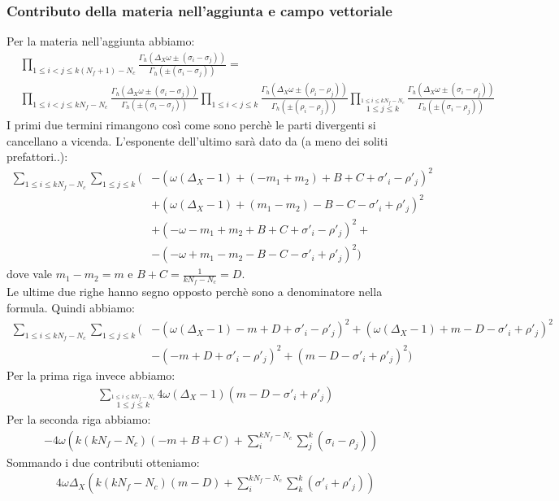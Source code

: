 \documentclass[a4paper,12pt]{article}
\begin{document}
\subsubsection{Contributo della materia nell'aggiunta e campo vettoriale }
Per la materia nell'aggiunta abbiamo:
\begin{align*}
& \prod_{ 1 \leq i<j \leq k(N_f+1)- N_c } \frac{ \Gamma_h( \Delta_X \omega \pm (\sigma_i - \sigma_j)) }{ \Gamma_h ( \pm (\sigma_i - \sigma_j) )} = \\
& \prod_{ 1 \leq i<j \leq kN_f- N_c } \frac{ \Gamma_h( \Delta_X \omega \pm (\sigma_i - \sigma_j)) }{ \Gamma_h ( \pm (\sigma_i - \sigma_j) )} 
 \prod_{ 1 \leq i<j \leq k } \frac{ \Gamma_h( \Delta_X \omega \pm (\rho_i - \rho_j)) }{ \Gamma_h ( \pm (\rho_i - \rho_j) )} 
 \prod_{ \overset{1 \leq i \leq kN_f- N_c }{ 1 \leq j \leq k }} \frac{ \Gamma_h( \Delta_X \omega \pm (\sigma_i - \rho_j)) }{ \Gamma_h ( \pm (\sigma_i - \rho_j) )} 
\end{align*}
I primi due termini rimangono così come sono perchè le parti divergenti si cancellano a vicenda.
L'esponente dell'ultimo sarà dato da (a meno dei soliti prefattori..):
\begin{align*}
\sum_{1 \leq i \leq kN_f- N_c } \sum_{ 1 \leq j \leq k }  \bigg( &  - \left( \omega( \Delta_X -1) + ( -m_1 + m_2) + B + C + \sigma'_i - \rho'_j \right)^2 \\
& + \left(  \omega( \Delta_X -1) + ( m_1 - m_2) - B - C - \sigma'_i + \rho'_j\right)^2 \\
& + \left( -\omega  - m_1 + m_2 + B + C + \sigma'_i - \rho'_j \right)^2 + \\
& - \left( -\omega +  m_1 - m_2 - B - C - \sigma'_i + \rho'_j\right)^2 
\bigg)
\end{align*}
dove vale $ m_1 - m_2 = m$ e $ B+C = \frac{1}{k N_f - N_c}= D$.\\
Le ultime due righe hanno segno opposto perchè sono a denominatore nella formula.
Quindi abbiamo:
\begin{align*}
\sum_{1 \leq i \leq kN_f- N_c } \sum_{ 1 \leq j \leq k }  \bigg( &  - \left( \omega( \Delta_X -1) -m + D + \sigma'_i - \rho'_j \right)^2  + \left(  \omega( \Delta_X -1) + m -D - \sigma'_i + \rho'_j\right)^2 \\
& -\left(  -m + D + \sigma'_i - \rho'_j \right)^2  + \left( m - D - \sigma'_i + \rho'_j\right)^2 
\bigg)
\end{align*}
Per la prima riga invece abbiamo:
\begin{align*}
& \sum_{ \overset{1 \leq i \leq kN_f- N_c }{ 1 \leq j \leq k }} 4 \omega ( \Delta_X -1) ( m - D - \sigma'_i + \rho'_j)
\end{align*} 
Per la seconda riga abbiamo:
\begin{align*}
- 4 \omega \left( k ( k N_f - N_c )  ( - m + B + C) + \sum_i^{k N_f - N_c} \sum_j^{k} ( \sigma_i - \rho_j) \right)
\end{align*}
Sommando i due contributi otteniamo:
\begin{align*}
&  4 \omega \Delta_X \left( k ( k N_f - N_c)   (m - D) + \sum_i^{k N_f -N_c} \sum_k^{k }  ( \sigma'_i + \rho'_j)\right)
\end{align*}
\end{document}
